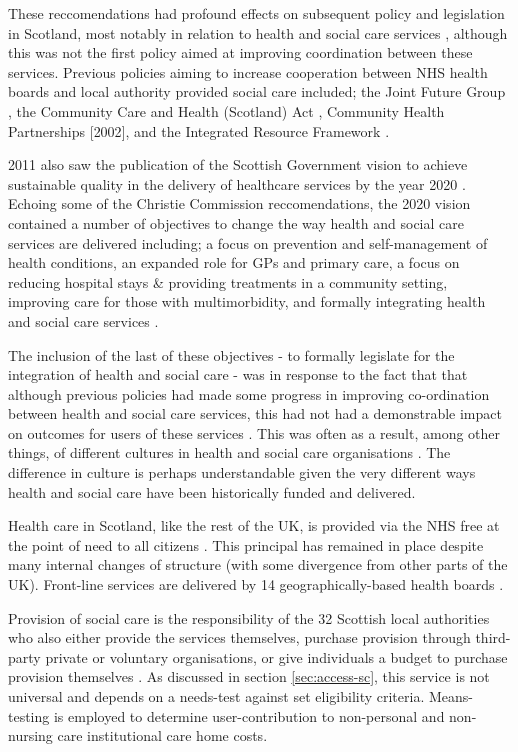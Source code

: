 \documentclass[12pt,]{report}
\begin{document}
These reccomendations had profound effects on subsequent policy and
legislation in Scotland, most notably in relation to health and social
care services \citep{RN451}, although this was not the first policy
aimed at improving coordination between these services. Previous
policies aiming to increase cooperation between NHS health boards and
local authority provided social care included; the Joint Future Group
\citeyearpar{RN452}, the Community Care and Health (Scotland) Act
\citeyearpar{RN453}, Community Health Partnerships {[}2002{]}, and the
Integrated Resource Framework \citep{RN454}.

2011 also saw the publication of the Scottish Government vision to
achieve sustainable quality in the delivery of healthcare services by
the year 2020 \citep{RN457}. Echoing some of the Christie Commission
reccomendations, the 2020 vision contained a number of objectives to
change the way health and social care services are delivered including;
a focus on prevention and self-management of health conditions, an
expanded role for GPs and primary care, a focus on reducing hospital
stays \& providing treatments in a community setting, improving care for
those with multimorbidity, and formally integrating health and social
care services \citep{RN251}.

The inclusion of the last of these objectives - to formally legislate
for the integration of health and social care - was in response to the
fact that that although previous policies had made some progress in
improving co-ordination between health and social care services, this
had not had a demonstrable impact on outcomes for users of these
services \citep{RN458, RN252, RN369}. This was often as a result, among
other things, of different cultures in health and social care
organisations \citep{RN458}. The difference in culture is perhaps
understandable given the very different ways health and social care have
been historically funded and delivered.

Health care in Scotland, like the rest of the UK, is provided via the
NHS free at the point of need to all citizens \citep{RN456}. This
principal has remained in place despite many internal changes of
structure (with some divergence from other parts of the
UK)\citep{RN456}. Front-line services are delivered by 14
geographically-based health boards \citep{RN456}.

Provision of social care is the responsibility of the 32 Scottish local
authorities who also either provide the services themselves, purchase
provision through third-party private or voluntary organisations, or
give individuals a budget to purchase provision themselves
\citep{RN456}. As discussed in section \ref{sec:access-sc}, this service
is not universal and depends on a needs-test against set eligibility
criteria. Means-testing is employed to determine user-contribution to
non-personal and non-nursing care institutional care home costs.
\end{document}
